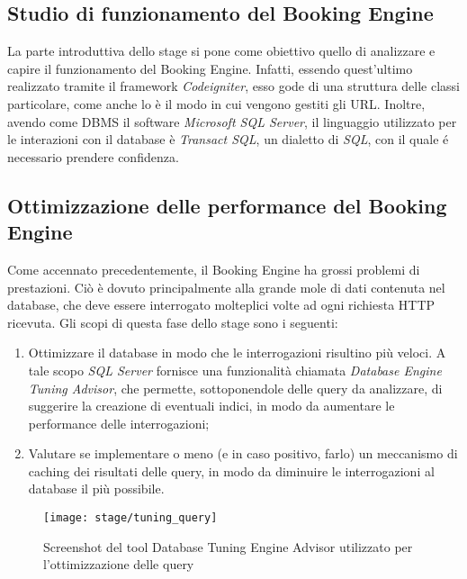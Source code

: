 \subsection{Studio di funzionamento del Booking Engine}
La parte introduttiva dello stage si pone come obiettivo quello di analizzare e capire il funzionamento del Booking Engine. Infatti, essendo quest'ultimo realizzato tramite il framework \textit{Codeigniter}, esso gode di una struttura delle classi particolare, come anche lo è il modo in cui vengono gestiti gli URL. Inoltre, avendo come DBMS il software \textit{Microsoft SQL Server}, il linguaggio utilizzato per le interazioni con il database è \textit{Transact SQL}, un dialetto di \textit{SQL}, con il quale é necessario prendere confidenza.

\subsection{Ottimizzazione delle performance del Booking Engine}
Come accennato precedentemente, il Booking Engine ha grossi problemi di prestazioni. Ciò è dovuto principalmente alla grande mole di dati contenuta nel database, che deve essere interrogato molteplici volte ad ogni richiesta HTTP ricevuta. Gli scopi di questa fase dello stage sono i seguenti:
\begin{enumerate}
	\item Ottimizzare il database in modo che le interrogazioni risultino più veloci. A tale scopo \textit{SQL Server} fornisce una funzionalità chiamata \textit{Database Engine Tuning Advisor}, che permette, sottoponendole delle query da analizzare, di suggerire la creazione di eventuali indici, in modo da aumentare le performance delle interrogazioni;
	\item Valutare se implementare o meno (e in caso positivo, farlo) un meccanismo di caching dei risultati delle query, in modo da diminuire le interrogazioni al database il più possibile.
\end{enumerate}

\begin{figure}[!h] 
	\centering 
	\texttt{[image: stage/tuning\_query]} 
	\caption{Screenshot del tool Database Tuning Engine Advisor utilizzato per l'ottimizzazione delle query}
\end{figure}

